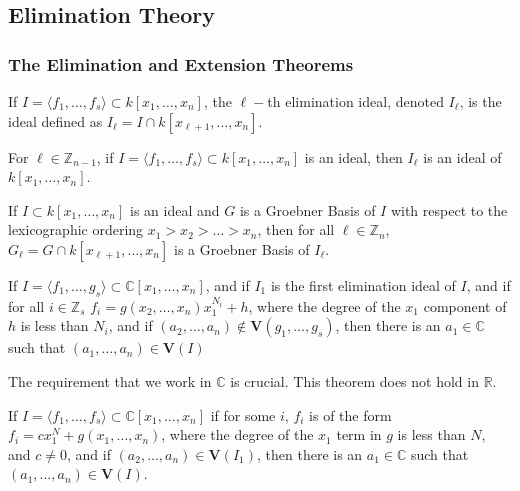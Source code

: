 \documentclass[../main.tex]{subfiles}
\begin{document}
\subsection{Elimination Theory}
%
\subsubsection{The Elimination and Extension Theorems}
%
\begin{definition}
If $I = \langle f_1,\hdots, f_s\rangle \subset k[x_1,\hdots ,x_n]$, the $\ell-$th elimination ideal, denoted $I_{\ell}$, is the ideal defined as $I_{\ell} = I \cap k[x_{\ell+1},\hdots, x_n]$.
\end{definition}

\begin{theorem}
For $\ell \in \mathbb{Z}_{n-1}$, if $I = \langle f_1,\hdots, f_s\rangle\subset k[x_1,\hdots ,x_n]$ is an ideal, then $I_{\ell}$ is an ideal of $k[x_1,\hdots ,x_n]$.
\end{theorem}

\begin{theorem}
If $I\subset k[x_1,\hdots ,x_n]$ is an ideal and $G$ is a Groebner Basis of $I$ with respect to the lexicographic ordering $x_1>x_2>\hdots > x_n$, then for all $\ell \in \mathbb{Z}_{n}$, $G_{\ell} = G\cap k[x_{\ell+1},\hdots, x_n]$ is a Groebner Basis of $I_{\ell}$.
\end{theorem}

\begin{theorem}
If $I = \langle f_1,\hdots, g_s\rangle \subset \mathbb{C}[x_1,\hdots ,x_n]$, and if $I_1$ is the first elimination ideal of $I$, and if for all $i\in \mathbb{Z}_s$ $f_i = g(x_2,\hdots, x_n)x_1^{N_i}+h$, where the degree of the $x_1$ component of $h$ is less than $N_i$, and if $(a_2,\hdots, a_n)\notin \textbf{V}(g_1,\hdots, g_s)$, then there is an $a_1 \in \mathbb{C}$ such that $(a_1,\hdots, a_n)\in \textbf{V}(I)$
\end{theorem}

\begin{remark}
The requirement that we work in $\mathbb{C}$ is crucial. This theorem does not hold in $\mathbb{R}$. 
\end{remark}

\begin{theorem}
If $I = \langle f_1,\hdots, f_s\rangle \subset \mathbb{C}[x_1,\hdots, x_n]$ if for some $i$, $f_i$ is of the form $f_i = cx_1^N + g(x_1,\hdots, x_n)$, where the degree of the $x_1$ term in $g$ is less than $N$, and $c \ne 0$, and if $(a_2,\hdots, a_n) \in \textbf{V}(I_{1})$, then there is an $a_1 \in \mathbb{C}$ such that $(a_1,\hdots, a_n) \in \textbf{V}(I)$.
\end{theorem}
%
\end{document}
